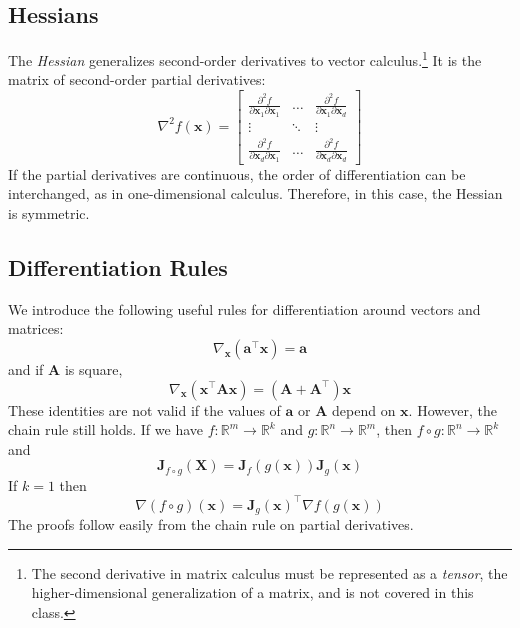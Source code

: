 \documentclass{article}
\begin{document}
\subsection{Hessians}
The \textit{Hessian} generalizes second-order derivatives to vector calculus.\footnote{The second derivative in matrix calculus must be represented as a \textit{tensor}, the higher-dimensional generalization of a matrix, and is not covered in this class.} It is the matrix of second-order partial derivatives: $$\nabla^2f(\mathbf{x}) = \begin{bmatrix} \frac{\partial^2f}{\partial \mathbf{x}_1\partial\mathbf{x}_1} & \hdots & \frac{\partial^2f}{\partial\mathbf{x}_1\partial\mathbf{x}_d} \\ \vdots & \ddots & \vdots \\ \frac{\partial^2f}{\partial \mathbf{x}_d\partial\mathbf{x}_1} & \hdots & \frac{\partial^2f}{\partial\mathbf{x}_d\partial\mathbf{x}_d} \end{bmatrix}$$ If the partial derivatives are continuous, the order of differentiation can be interchanged, as in one-dimensional calculus. Therefore, in this case, the Hessian is symmetric.

\subsection{Differentiation Rules}
We introduce the following useful rules for differentiation around vectors and matrices: $$\nabla_{\mathbf{x}}(\mathbf{a}^{\top}\mathbf{x}) = \mathbf{a}$$ and if $\mathbf{A}$ is square, $$\nabla_{\mathbf{x}}(\mathbf{x}^{\top}\mathbf{Ax}) = \mathbf{(A + A^{\top})x}$$ These identities are not valid if the values of $\mathbf{a}$ or $\mathbf{A}$ depend on $\mathbf{x}$. However, the chain rule still holds. If we have $f: \mathbb{R}^m \rightarrow \mathbb{R}^k$ and $g: \mathbb{R}^n \rightarrow \mathbb{R}^m$, then $f \circ g: \mathbb{R}^n \rightarrow \mathbb{R}^k$ and $$\mathbf{J}_{f \circ g}(\mathbf{X}) = \mathbf{J}_f(g(\mathbf{x}))\mathbf{J}_g(\mathbf{x})$$ If $k = 1$ then $$\nabla (f \circ g)(\mathbf{x}) = \mathbf{J}_g(\mathbf{x})^{\top}\nabla f(g(\mathbf{x}))$$ The proofs follow easily from the chain rule on partial derivatives.

\clearpage
\end{document}
